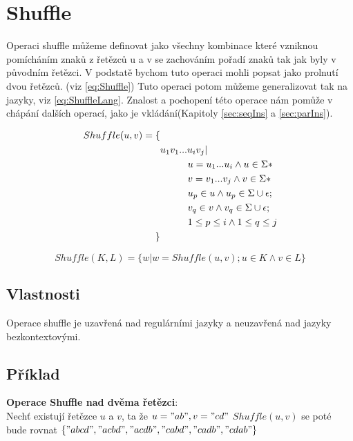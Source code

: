 \section{Shuffle}
Operaci shuffle můžeme definovat jako všechny kombinace které vzniknou pomícháním znaků z řetězců u a v se zachováním pořadí znaků tak jak byly v původním řetězci. V podstatě bychom tuto operaci mohli popsat jako prolnutí dvou řetězců. (viz \ref{eq:Shuffle}) Tuto operaci potom můžeme generalizovat tak na jazyky, viz \ref{eq:ShuffleLang}. Znalost a pochopení této operace nám pomůže v chápání dalších operací, jako je vkládání(Kapitoly \ref{sec:seqIns} a \ref{sec:parIns}).


\begin{equation}\label{eq:Shuffle}
\begin{split}
Shuffle(u,v) = \{& \\
& u_{1}v_{1}...u_{i}v_{j}|\\
&\hspace*{1cm} u=u_{1}...u_{i} \land u \in \Sigma* \\
&\hspace*{1cm} v=v_{1}...v_{j} \land v \in \Sigma*\\
&\hspace*{1cm} u_{p} \in u \land u_{p} \in \Sigma \cup \epsilon;\\
&\hspace*{1cm} v_{q} \in v  \land v_{q} \in \Sigma \cup \epsilon;\\
&\hspace*{1cm} 1 \leq p \leq i \land 1 \leq q \leq j\\
\}&
\end{split}
\end{equation}

\begin{equation}\label{eq:ShuffleLang}
Shuffle(K,L) = \{w|w=Shuffle(u,v); u \in K \land v \in L \}
\end{equation}


\subsection{Vlastnosti}
Operace shuffle je uzavřená nad regulárními jazyky a neuzavřená nad jazyky bezkontextovými.

\subsection{Příklad}
\textbf{Operace Shuffle nad dvěma řetězci}:\\
Nechť existují řetězce $u$ a $v$, ta že $u = "ab", v = "cd"$ 
$Shuffle(u,v)$ se poté bude rovnat $\{"abcd", "acbd", "acdb", "cabd", "cadb", "cdab"\}$
